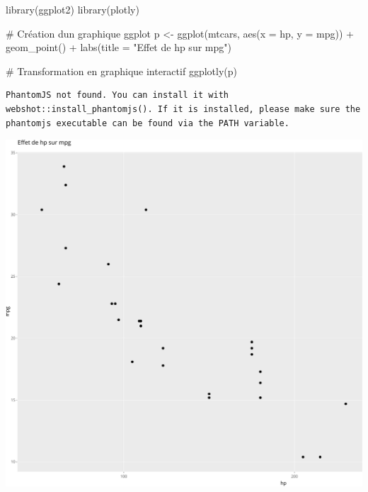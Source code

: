 \documentclass[
  letterpaper,
  DIV=11,
  numbers=noendperiod]{scrreprt}
\newenvironment{Shaded}{\begin{snugshade}}{\end{snugshade}}
\newcommand{\AttributeTok}[1]{\textcolor[rgb]{0.40,0.45,0.13}{#1}}
\newcommand{\CommentTok}[1]{\textcolor[rgb]{0.37,0.37,0.37}{#1}}
\newcommand{\FunctionTok}[1]{\textcolor[rgb]{0.28,0.35,0.67}{#1}}
\newcommand{\NormalTok}[1]{\textcolor[rgb]{0.00,0.23,0.31}{#1}}
\newcommand{\OtherTok}[1]{\textcolor[rgb]{0.00,0.23,0.31}{#1}}
\newcommand{\SpecialCharTok}[1]{\textcolor[rgb]{0.37,0.37,0.37}{#1}}
\newcommand{\StringTok}[1]{\textcolor[rgb]{0.13,0.47,0.30}{#1}}
\begin{document}
\begin{Shaded}
\begin{Highlighting}[]
\FunctionTok{library}\NormalTok{(ggplot2)}
\FunctionTok{library}\NormalTok{(plotly)}
\end{Highlighting}
\end{Shaded}

\begin{Shaded}
\begin{Highlighting}[]
\CommentTok{\# Création d\textquotesingle{}un graphique ggplot}
\NormalTok{p }\OtherTok{\textless{}{-}} \FunctionTok{ggplot}\NormalTok{(mtcars, }\FunctionTok{aes}\NormalTok{(}\AttributeTok{x =}\NormalTok{ hp, }\AttributeTok{y =}\NormalTok{ mpg)) }\SpecialCharTok{+}
  \FunctionTok{geom\_point}\NormalTok{() }\SpecialCharTok{+}
  \FunctionTok{labs}\NormalTok{(}\AttributeTok{title =} \StringTok{"Effet de hp sur mpg"}\NormalTok{)}

\CommentTok{\# Transformation en graphique interactif}
\FunctionTok{ggplotly}\NormalTok{(p)}
\end{Highlighting}
\end{Shaded}

\begin{verbatim}
PhantomJS not found. You can install it with webshot::install_phantomjs(). If it is installed, please make sure the phantomjs executable can be found via the PATH variable.
\end{verbatim}

\includegraphics{chapitre_6_files/figure-pdf/unnamed-chunk-13-1.pdf}
\end{document}
